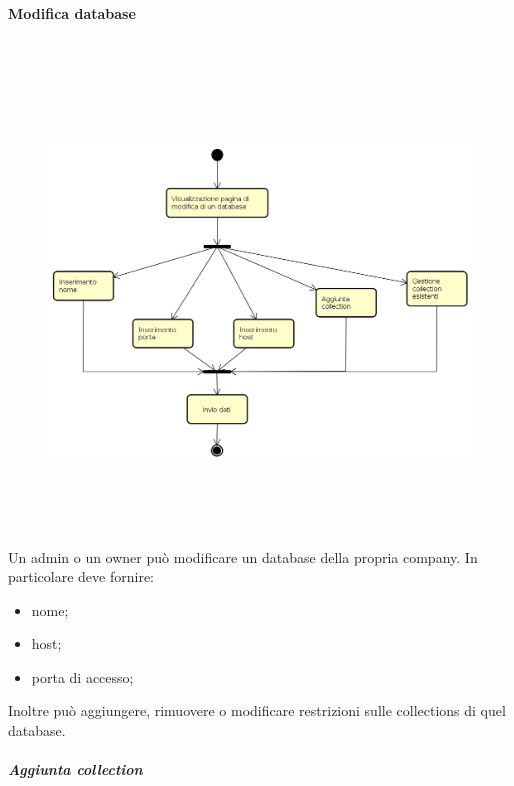 \paragraph{Modifica database} \mbox{} \\
\begin{figure}[H]
\begin{center}
\includegraphics[height=12cm]{res/sections/backend/activities/modificaDatabase.png}
\end{center}
\end{figure}
Un admin o un owner può modificare un database della propria company. In particolare deve fornire:
\begin{itemize}
\item nome;
\item host;
\item porta di accesso;
\end{itemize}
Inoltre può aggiungere, rimuovere o modificare restrizioni sulle collections di quel database.
\subparagraph{Aggiunta collection} \mbox{} \\
